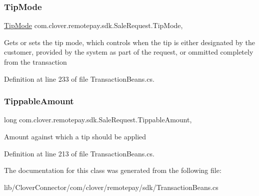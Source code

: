 \subsubsection{\texorpdfstring{Tip\+Mode}{TipMode}}
{\footnotesize\ttfamily \hyperlink{namespacecom_1_1clover_1_1remotepay_1_1sdk_a3d5c6c8529ad6bcdc5a4fd5224361ac5}{Tip\+Mode} com.\+clover.\+remotepay.\+sdk.\+Sale\+Request.\+Tip\+Mode\hspace{0.3cm}{\ttfamily [get]}, {\ttfamily [set]}}



Gets or sets the tip mode, which controls when the tip is either designated by the customer, provided by the system as part of the request, or ommitted completely from the transaction 



Definition at line 233 of file Transaction\+Beans.\+cs.

\mbox{\label{classcom_1_1clover_1_1remotepay_1_1sdk_1_1_sale_request_aad74927135a360b3b391c96160195dac}} 
\subsubsection{\texorpdfstring{Tippable\+Amount}{TippableAmount}}
{\footnotesize\ttfamily long com.\+clover.\+remotepay.\+sdk.\+Sale\+Request.\+Tippable\+Amount\hspace{0.3cm}{\ttfamily [get]}, {\ttfamily [set]}}



Amount against which a tip should be applied 



Definition at line 213 of file Transaction\+Beans.\+cs.



The documentation for this class was generated from the following file\+:\begin{DoxyCompactItemize}
\item 
lib/\+Clover\+Connector/com/clover/remotepay/sdk/Transaction\+Beans.\+cs\end{DoxyCompactItemize}
